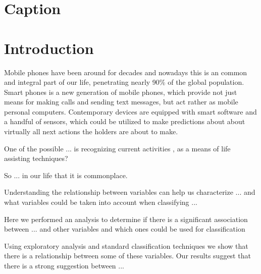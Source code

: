 \documentclass[a4paper,12pt]{extarticle}
\begin{document}
\section*{Caption}

\section{Introduction}

Mobile phones have been around for decades and nowadays this is an common and integral part of our life, penetrating nearly 90\% of the global population. \cite{sourse:wiki.mobile.phones} Smart phones is a new generation of mobile phones, which provide not just means for making calls and sending text messages, but act rather as mobile personal computers. Contemporary devices are equipped with smart software and a handful of sensors, which could be utilized to make predictions about about virtually all next actions the holders are about to make. 

One of the possible ... is recognizing current activities , as a means of life assisting techniques?   

So ... in our life that it is commonplace. 

Understanding the relationship between variables can help us characterize ... and what variables could be taken into account when classifying ... 

Here we performed an analysis to determine if there is a significant association between ... and other variables and which ones could be used for classification   

Using exploratory analysis and standard classification techniques we show that there is a relationship between some of these variables. Our results suggest that there is a strong suggestion between ...


\end{document}
